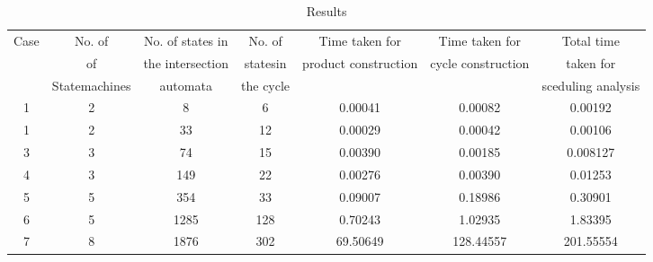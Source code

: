 \begin{table}[ht]
\caption{Results}
\centering
\begin{tabular}{|c | c | c | c | c | c | c |}
\hline %
Case & No. of           &  No. of states in   & No. of    &  Time taken for        &   Time taken for      & Total time           \\       
     & of               &  the intersection   & statesin  &  product construction  &   cycle construction  & taken for            \\  
     & Statemachines    &  automata           & the cycle  &                       &                       & sceduling analysis   \\
\hline
\hline
1 & 2 & 8 & 6 &  0.00041    & 0.00082 &  0.00192\\

1 & 2  & 33 & 12 &  0.00029  & 0.00042 &  0.00106 \\

3 & 3  & 74 & 15 & 0.00390 & 0.00185 & 0.008127 \\

4 & 3 & 149 & 22 & 0.00276 & 0.00390 & 0.01253 \\

5 & 5 & 354 & 33 &  0.09007 &  0.18986 & 0.30901 \\

6 & 5 & 1285 & 128 & 0.70243 & 1.02935 &  1.83395\\

7 & 8 & 1876 & 302 & 69.50649 & 128.44557 & 201.55554\\



\hline

\end{tabular}
\label{table:nonlin}

\end{table}
